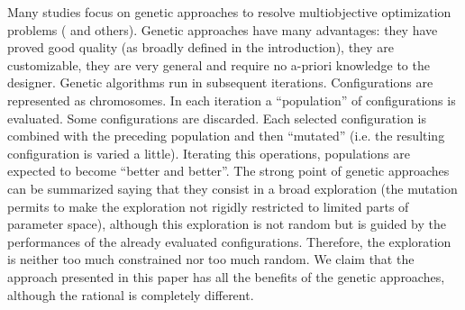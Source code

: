 Many studies focus on genetic approaches to resolve multiobjective
optimization problems (\cite{} and others). Genetic approaches
have many advantages: they have proved good quality (as broadly defined
in the introduction), they are customizable, they are very general
and require no a-priori knowledge to the designer. Genetic algorithms
run in subsequent iterations. Configurations are represented as chromosomes.
In each iteration a ``population'' of configurations is evaluated.
Some configurations are discarded. Each selected configuration is
combined with the preceding population and then ``mutated'' (i.e.
the resulting configuration is varied a little). Iterating this operations,
populations are expected to become ``better and better''. The strong
point of genetic approaches can be summarized saying that they consist
in a broad exploration (the mutation permits to make the exploration
not rigidly restricted to limited parts of parameter space), although
this exploration is not random but is guided by the performances of
the already evaluated configurations. Therefore, the exploration is
neither too much constrained nor too much random. We claim that the
approach presented in this paper has all the benefits of the genetic
approaches, although the rational is completely different.
